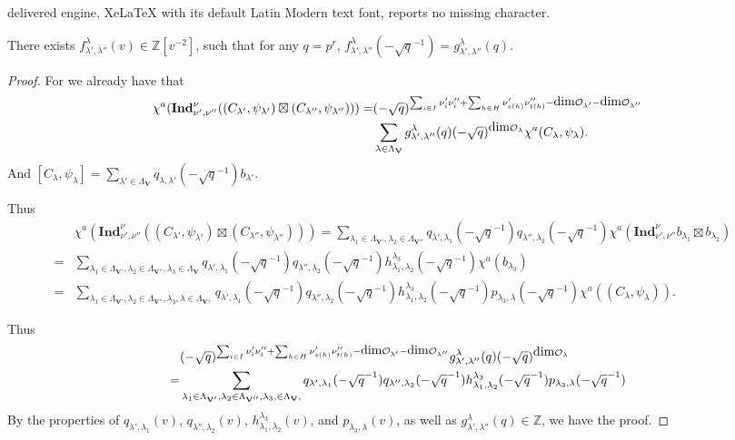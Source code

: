 \documentclass[10pt,a4paper]{amsart}
\def\Ind{\mathbf{Ind}}
\def\bbZ{{\mathbb Z}}  \def\bbQ{{\mathbb Q}}
\def\bfV{{\mathbf V}}
\def\dim{\mbox{\rm dim}}   \def\End{\mbox{\rm End}}
\newcommand\mo{{\mathcal{O}}}
\begin{document}
delivered engine, XeLaTeX with its default Latin Modern text font, reports no missing character.
\begin{corollary}\label{2}
   There exists $f_{\lambda',\lambda''}^{\lambda}(v)\in \bbZ[v^{-2}]$, such that for any $q=p^r$, $f_{\lambda',\lambda''}^{\lambda}(-\sqrt{q}^{-1})=g_{\lambda',\lambda''}^{\lambda}(q)$.
\end{corollary}

\begin{proof}
   For we already have that $$\begin{aligned}
       \chi^a(\Ind_{\nu',\nu''}^{\nu}((C_{\lambda'},\psi_{\lambda'})\boxtimes (C_{\lambda''},\psi_{\lambda''})))=&(-\sqrt{q})^{\sum_{i\in I}\nu_i'\nu_i''+\sum_{h\in H}\nu_{s(h)}'\nu_{t(h)}''-\dim\mo_{\lambda'}-\dim\mo_{\lambda''}}\\&\sum_{\lambda\in \Lambda_{\bfV}}g_{\lambda',\lambda''}^{\lambda}(q)(-\sqrt{q})^{\dim\mo_{\lambda}}\chi^a(C_{\lambda},\psi_{\lambda}).\end{aligned}$$
    And 
    $[C_{\lambda},\psi_{\lambda}]=\sum_{\lambda'\in \Lambda_{\bfV}}q_{\lambda,\lambda'}(-\sqrt{q}^{-1})b_{\lambda'}.$
    
    Thus
    $$\begin{aligned}   
    &\chi^a(\Ind_{\nu',\nu''}^{\nu}((C_{\lambda'},\psi_{\lambda'})\boxtimes (C_{\lambda''},\psi_{\lambda''})))=\sum_{\lambda_1\in \Lambda_{\bfV'},\lambda_2\in \Lambda_{\bfV''}}q_{\lambda',\lambda_1}(-\sqrt{q}^{-1})q_{\lambda'',\lambda_2}(-\sqrt{q}^{-1})\chi^a(\Ind_{\nu',\nu''}^{\nu}b_{\lambda_1}\boxtimes b_{\lambda_2})\\=&\sum_{\lambda_1\in \Lambda_{\bfV'},\lambda_2\in \Lambda_{\bfV''},\lambda_3\in \Lambda_{\bfV}}q_{\lambda',\lambda_1}(-\sqrt{q}^{-1})q_{\lambda'',\lambda_2}(-\sqrt{q}^{-1})h_{\lambda_1,\lambda_2}^{\lambda_3}(-\sqrt{q}^{-1})\chi^a(b_{\lambda_3})\\=&\sum_{\lambda_1\in \Lambda_{\bfV'},\lambda_2\in \Lambda_{\bfV''},\lambda_3,\lambda\in \Lambda_{\bfV}, }q_{\lambda',\lambda_1}(-\sqrt{q}^{-1})q_{\lambda'',\lambda_2}(-\sqrt{q}^{-1})h_{\lambda_1,\lambda_2}^{\lambda_3}(-\sqrt{q}^{-1})p_{\lambda_3,\lambda}(-\sqrt{q}^{-1})\chi^a((C_{\lambda},\psi_{\lambda})).&\end{aligned}$$

   Thus 
   $$\begin{aligned}      
  &(-\sqrt{q})^{\sum_{i\in I}\nu_i'\nu_i''+\sum_{h\in H}\nu_{s(h)}'\nu_{t(h)}''-\dim\mo_{\lambda'}-\dim\mo_{\lambda''}}g_{\lambda',\lambda''}^{\lambda}(q)(-\sqrt{q})^{\dim\mo_{\lambda}}\\=&\sum_{\lambda_1\in \Lambda_{\bfV'},\lambda_2\in \Lambda_{\bfV''},\lambda_3,\in \Lambda_{\bfV}, }q_{\lambda',\lambda_1}(-\sqrt{q}^{-1})q_{\lambda'',\lambda_2}(-\sqrt{q}^{-1})h_{\lambda_1,\lambda_2}^{\lambda_3}(-\sqrt{q}^{-1})p_{\lambda_3,\lambda}(-\sqrt{q}^{-1}) \end{aligned}$$
  By the properties of $q_{\lambda',\lambda_1}(v)$, $q_{\lambda'',\lambda_2}(v)$, $h_{\lambda_1,\lambda_2}^{\lambda_3}(v)$, and $p_{\lambda_3,\lambda}(v)$, as well as $g_{\lambda',\lambda''}^{\lambda}(q)\in \bbZ$, we have the proof.
\end{proof}
\end{document}
